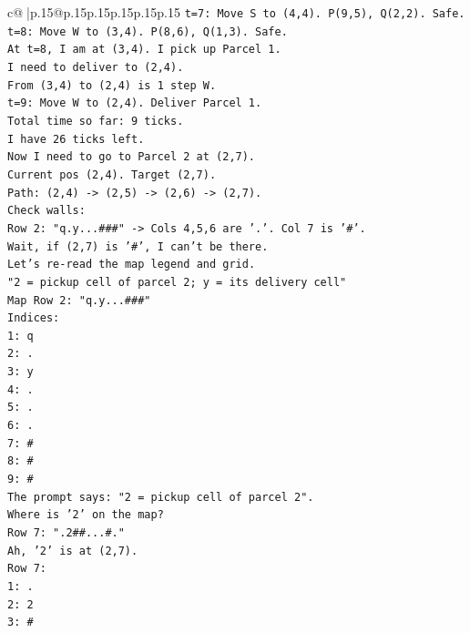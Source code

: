 \documentclass{article}
\begin{document}
{\begin{supertabular}{c@{$\;$}|p{.15\linewidth}@{}p{.15\linewidth}p{.15\linewidth}p{.15\linewidth}p{.15\linewidth}p{.15\linewidth}}
{{{\texttt{t=7: Move S to (4,4). P(9,5), Q(2,2). Safe.} \\
\texttt{t=8: Move W to (3,4). P(8,6), Q(1,3). Safe.} \\
\texttt{At t=8, I am at (3,4). I pick up Parcel 1.} \\
\texttt{I need to deliver to (2,4).} \\
\texttt{From (3,4) to (2,4) is 1 step W.} \\
\texttt{t=9: Move W to (2,4). Deliver Parcel 1.} \\
\texttt{Total time so far: 9 ticks.} \\
\texttt{I have 26 ticks left.} \\
\texttt{Now I need to go to Parcel 2 at (2,7).} \\
\texttt{Current pos (2,4). Target (2,7).} \\
\texttt{Path: (2,4) {-}> (2,5) {-}> (2,6) {-}> (2,7).} \\
\texttt{Check walls:} \\
\texttt{Row 2: "q.y...\#\#\#" {-}> Cols 4,5,6 are '.'. Col 7 is '\#'.} \\
\texttt{Wait, if (2,7) is '\#', I can't be there.} \\
\texttt{Let's re{-}read the map legend and grid.} \\
\texttt{"2 = pickup cell of parcel 2; y = its delivery cell"} \\
\texttt{Map Row 2: "q.y...\#\#\#"} \\
\texttt{Indices:} \\
\texttt{1: q} \\
\texttt{2: .} \\
\texttt{3: y} \\
\texttt{4: .} \\
\texttt{5: .} \\
\texttt{6: .} \\
\texttt{7: \#} \\
\texttt{8: \#} \\
\texttt{9: \#} \\
\texttt{The prompt says: "2 = pickup cell of parcel 2".} \\
\texttt{Where is '2' on the map?} \\
\texttt{Row 7: ".2\#\#...\#."} \\
\texttt{Ah, '2' is at (2,7).} \\
\texttt{Row 7:} \\
\texttt{1: .} \\
\texttt{2: 2} \\
\texttt{3: \#} \\
}}}
\end{supertabular}}
\end{document}
